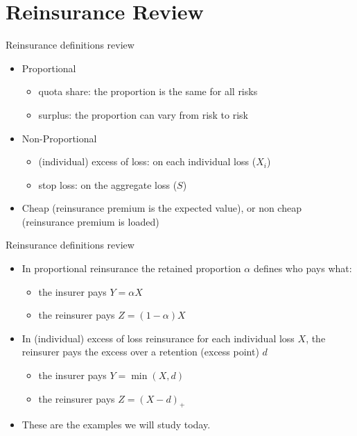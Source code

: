 \documentclass[11pt]{beamer}
\begin{document}
\section{Reinsurance Review}
\begin{frame}{Reinsurance definitions review}

  \begin{itemize}
  \item Proportional
    \begin{itemize}
    \item quota share: the proportion is the same for all risks
    \item surplus: the proportion can vary from risk to risk
    \end{itemize}
    \vfill
  \item Non-Proportional
    \begin{itemize}
    \item (individual) excess of loss: on each individual loss ($X_i$)
    \item stop loss: on the aggregate loss ($S$)
    \end{itemize}
    \vfill
  \item Cheap (reinsurance premium is the expected value), or \linebreak non cheap (reinsurance premium is loaded)
  \end{itemize}
\end{frame}
\begin{frame}{Reinsurance definitions review}

\begin{itemize}

\item In proportional reinsurance the \alert{retained proportion $\alpha$} defines who pays what:
  \begin{itemize}
  \item the insurer pays $Y=\alpha X$
  \item the reinsurer pays $Z=(1-\alpha) X$
  \end{itemize}
 
\vfill

\item In (individual) excess of loss reinsurance for each individual loss $X$, the reinsurer pays the excess over a \alert{retention (excess point) $d$}
    \begin{itemize}
    \item the insurer pays $Y=\min(X,d)$
    \item the reinsurer pays $Z=(X-d)_+$
    \end{itemize}

\vfill

\item These are the examples we will study today.

\end{itemize}

\end{frame}
\end{document}
